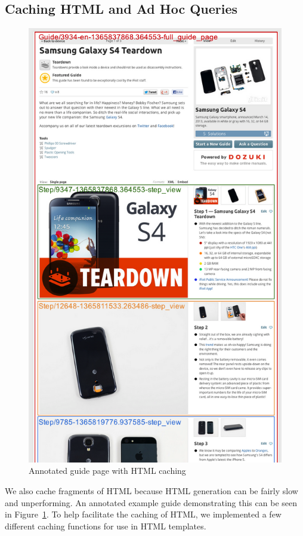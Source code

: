 \documentclass[12pt]{ucthesis}
\begin{document}
\subsection{Caching HTML and Ad Hoc Queries}
\begin{figure}[hbtp]
\centering
\includegraphics[width=\textwidth,height=0.95\textheight]{assets/annotatedCachedGuidePage.png}
\caption{Annotated guide page with HTML caching}
\label{fig:annotatedCachedGuidePage}
\end{figure}

We also cache fragments of HTML because HTML generation can be fairly slow and unperforming.
An annotated example guide demonstrating this can be seen in Figure~\ref{fig:annotatedCachedGuidePage}.
To help facilitate the caching of HTML, we implemented a few different caching functions for use in HTML templates.
\end{document}
